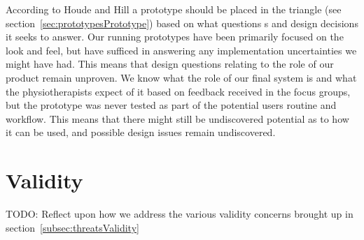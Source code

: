 According to Houde and Hill a prototype should be placed in the triangle (see section~\ref{sec:prototypesPrototype}) based on what questions s and design decisions it seeks to answer. Our running prototypes have been primarily focused on the look and feel, but have sufficed in answering any implementation uncertainties we might have had. This means that design questions relating to the role of our product remain unproven. We know what the role of our final system is and what the physiotherapists expect of it based on feedback received in the focus groups, but the prototype was never tested as part of the potential users routine and workflow. This means that there might still be undiscovered potential as to how it can be used, and possible design issues remain undiscovered.

\section{Validity}
TODO: Reflect upon how we address the various validity concerns brought up in section~\ref{subsec:threatsValidity}